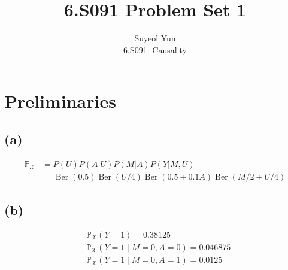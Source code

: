 \documentclass[10pt]{article}
\begin{document}
 
\title{6.S091 Problem Set 1}
\author{Suyeol Yun\\
6.S091: Causality}
\maketitle
 
\section{Preliminaries}
\subsection{(a)} 
\begin{align*}
\mathbb{P}_{\mathcal{X}} &= P(U)P(A|U)P(M|A)P(Y|M, U) \\
&= \operatorname{Ber}(0.5) \operatorname{Ber}(U/4) \operatorname{Ber}(0.5 + 0.1A)\operatorname{Ber}(M/2 + U/4)
\end{align*}

\subsection{(b)} 
\begin{align*}
&\mathbb{P}_{\mathcal{X}}(Y=1) = 0.38125\\
&\mathbb{P}_{\mathcal{X}}(Y=1 \mid M=0, A=0)= 0.046875\\
&\mathbb{P}_{\mathcal{X}}(Y=1 \mid M=0, A=1)= 0.0125\\
\end{align*}




\end{document}
